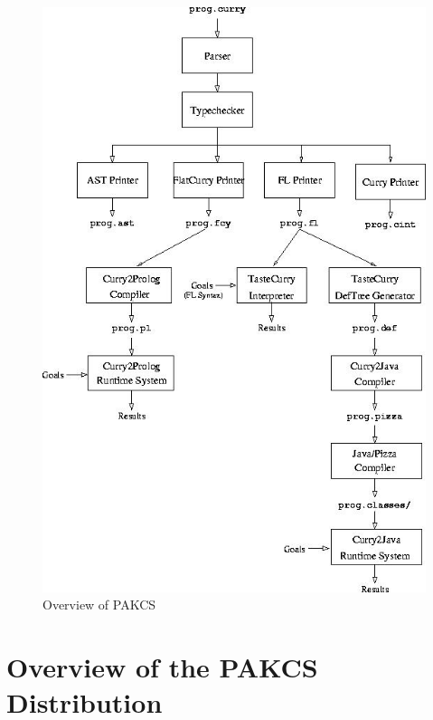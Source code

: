 \documentclass[11pt,fleqn]{article}
\begin{document}
\newpage



\newpage

\begin{figure}%
\begin{center}
 \includegraphics[scale=0.85]{pakcs_overview.jpg}
\end{center}\vspace{-5ex}
\caption{Overview of PAKCS\label{fig-pakcs}}
\end{figure}

\section{Overview of the PAKCS Distribution}
\end{document}
